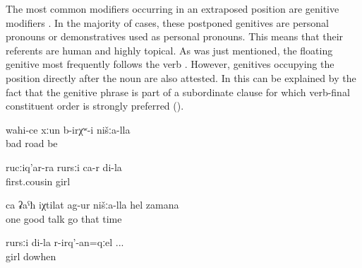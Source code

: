 The most common modifiers occurring in an extraposed position are genitive modifiers . In the majority of cases, these postponed genitives are personal pronouns or demonstratives used as personal pronouns. This means that their referents are human and highly topical. As was just mentioned, the floating genitive most frequently follows the verb . However, genitives occupying the position directly after the noun are also attested. In  this can be explained by the fact that the genitive phrase is part of a subordinate clause for which verb-final constituent order is strongly preferred ().
%
\begin{exe}
	\ex	\label{ex:There was a bad road in our (area)}
	\gll	wahi-ce	xːun	b-irχʷ-i	nišːa-lla\\
		bad	road	be	\\
	\glt	{}

	\ex	\label{ex:(She) is the daughter of my cousin}
	\gll	rucːiq'ar-ra	rursːi	ca-r	di-la\\
		first.cousin	girl		\\
	\glt	{}

	\ex	\label{ex:‎We had a good conversation at that time}
	\gll	ca	ʡaˁħ	iχtilat	ag-ur	nišːa-lla	hel	zamana\\
		one	good	talk	go		that	time\\
	\glt	{}

	\ex	\label{ex:when I gave birth to my daughter}
	\gll	rursːi	di-la	r-irq'-an=qːel ...\\
		girl		dowhen\\
	\glt	{}
\end{exe}

